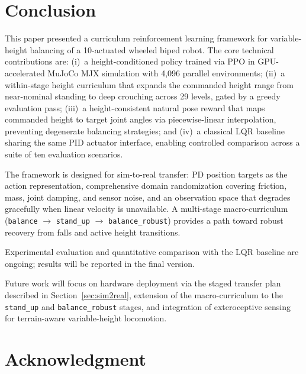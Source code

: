 \documentclass[conference]{IEEEtran}
\begin{document}
\section{Conclusion}
This paper presented a curriculum reinforcement learning framework for
variable-height balancing of a 10-actuated wheeled biped robot.
The core technical contributions are: (i)~a height-conditioned policy
trained via PPO in GPU-accelerated MuJoCo MJX simulation with 4,096
parallel environments; (ii)~a within-stage height curriculum that
expands the commanded height range from near-nominal standing to
deep crouching across 29 levels, gated by a greedy evaluation pass;
(iii)~a height-consistent natural pose reward that maps commanded
height to target joint angles via piecewise-linear interpolation,
preventing degenerate balancing strategies; and (iv)~a classical LQR
baseline sharing the same PID actuator interface, enabling controlled
comparison across a suite of ten evaluation scenarios.

The framework is designed for sim-to-real transfer: PD position targets
as the action representation, comprehensive domain randomization covering
friction, mass, joint damping, and sensor noise, and an observation
space that degrades gracefully when linear velocity is unavailable.
A multi-stage macro-curriculum (\texttt{balance} $\to$
\texttt{stand\_up} $\to$ \texttt{balance\_robust}) provides a path
toward robust recovery from falls and active height transitions.

Experimental evaluation and quantitative comparison with the LQR baseline
are ongoing; results will be reported in the final version.

Future work will focus on hardware deployment via the staged transfer
plan described in Section~\ref{sec:sim2real}, extension of the
macro-curriculum to the \texttt{stand\_up} and \texttt{balance\_robust}
stages, and integration of exteroceptive sensing for terrain-aware
variable-height locomotion.

\section*{Acknowledgment}
\end{document}

